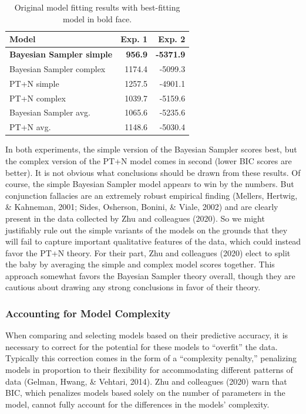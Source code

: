 \documentclass[
  english,
  man,floatsintext]{apa6}
\begin{document}
\begin{table}

\caption{\label{tab:table1}Original model fitting results with best-fitting model in bold face.}
\centering
\begin{tabular}[t]{lrr}
\toprule
Model & Exp. 1 & Exp. 2\\
\midrule
\textbf{Bayesian Sampler simple} & \textbf{956.9} & \textbf{-5371.9}\\
Bayesian Sampler complex & 1174.4 & -5099.3\\
PT+N simple & 1257.5 & -4901.1\\
PT+N complex & 1039.7 & -5159.6\\
Bayesian Sampler avg. & 1065.6 & -5235.6\\
\addlinespace
PT+N avg. & 1148.6 & -5030.4\\
\bottomrule
\end{tabular}
\end{table}

In both experiments, the simple version of the Bayesian Sampler scores best, but the complex version of the PT+N model comes in second (lower BIC scores are better). It is not obvious what conclusions should be drawn from these results. Of course, the simple Bayesian Sampler model appears to win by the numbers. But conjunction fallacies are an extremely robust empirical finding (Mellers, Hertwig, \& Kahneman, 2001; Sides, Osherson, Bonini, \& Viale, 2002) and are clearly present in the data collected by Zhu and colleagues (2020). So we might justifiably rule out the simple variants of the models on the grounds that they will fail to capture important qualitative features of the data, which could instead favor the PT+N theory. For their part, Zhu and colleagues (2020) elect to split the baby by averaging the simple and complex model scores together. This approach somewhat favors the Bayesian Sampler theory overall, though they are cautious about drawing any strong conclusions in favor of their theory.

\hypertarget{accounting-for-model-complexity}{%
\subsubsection{Accounting for Model Complexity}\label{accounting-for-model-complexity}}

When comparing and selecting models based on their predictive accuracy, it is necessary to correct for the potential for these models to ``overfit'' the data. Typically this correction comes in the form of a ``complexity penalty,'' penalizing models in proportion to their flexibility for accommodating different patterns of data (Gelman, Hwang, \& Vehtari, 2014). Zhu and colleagues (2020) warn that BIC, which penalizes models based solely on the number of parameters in the model, cannot fully account for the differences in the models' complexity.
\end{document}
